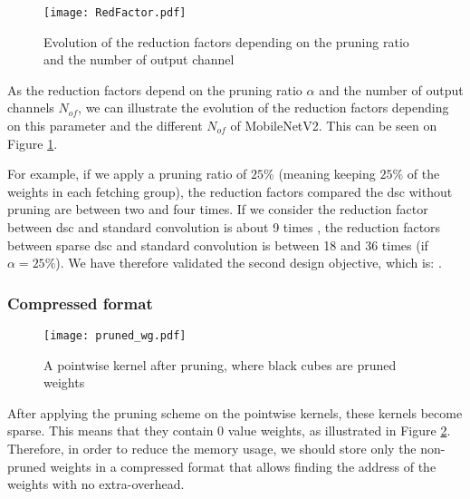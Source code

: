 \begin{figure}
    \centering
    \texttt{[image: RedFactor.pdf]}
    \caption{Evolution of the reduction factors depending on the pruning ratio and the number of output channel}
    \label{fig:redfacto}
\end{figure}
%
As the reduction factors depend on the pruning ratio $\alpha$ and the number of output channels $N_{of}$, we can illustrate the evolution of the reduction factors depending on this parameter and the different $N_{of}$ of MobileNetV2. This can be seen on Figure \ref{fig:redfacto}.

For example, if we apply a pruning ratio of $25\%$ (meaning keeping $25\%$ of the weights in each fetching group), the reduction factors compared the \acrshort{dsc} without pruning are between two and four times. If we consider the reduction factor between \acrshort{dsc} and standard convolution is about 9 times \cite{zhang_channel_2019}, the reduction factors between sparse \acrshort{dsc} and standard convolution is between 18 and 36 times (if $\alpha = 25\%$). We have therefore validated the second design objective, which is: \textbf{}.
%
\subsubsection{Compressed format}
%
\begin{figure}
    \centering
    \texttt{[image: pruned\_wg.pdf]}
    \caption{A pointwise kernel after pruning, where black cubes are pruned weights}
    \label{fig:pruned_wg}
\end{figure}
%
After applying the pruning scheme on the pointwise kernels, these kernels become sparse. This means that they contain 0 value weights, as illustrated in Figure \ref{fig:pruned_wg}. Therefore, in order to reduce the memory usage, we should store only the non-pruned weights in a compressed format that allows finding the address of the weights with no extra-overhead.

